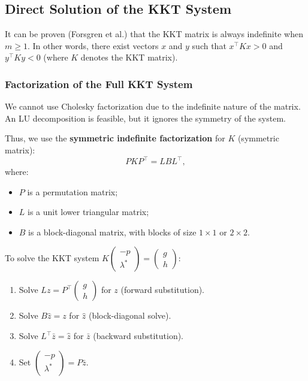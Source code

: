 \subsection{Direct Solution of the KKT System}

\begin{remarque}
    It can be proven (Forsgren et al.) that the KKT matrix is always indefinite when $m \ge 1$. In other words, there exist vectors $x$ and $y$ such that $x^\top K x > 0$ and $y^\top K y < 0$ (where $K$ denotes the KKT matrix).
\end{remarque}

\subsubsection{Factorization of the Full KKT System}

We cannot use Cholesky factorization due to the indefinite nature of the matrix.
An LU decomposition is feasible, but it ignores the symmetry of the system.

Thus, we use the \textbf{symmetric indefinite factorization} for $K$ (symmetric matrix):
\begin{equation}
    P K P^\top = L B L^\top,
\end{equation}
where:
\begin{itemize}
    \item $P$ is a permutation matrix;
    \item $L$ is a unit lower triangular matrix;
    \item $B$ is a block-diagonal matrix, with blocks of size $1 \times 1$ or $2 \times 2$.
\end{itemize}

To solve the KKT system $K \begin{pmatrix} -p \\ \lambda^* \end{pmatrix} = \begin{pmatrix} g \\ h \end{pmatrix}$:
\begin{enumerate}
    \item Solve $Lz = P^\top \begin{pmatrix} g \\ h \end{pmatrix}$ for $z$ (forward substitution).
    \item Solve $B\hat{z} = z$ for $\hat{z}$ (block-diagonal solve).
    \item Solve $L^\top \bar{z} = \hat{z}$ for $\bar{z}$ (backward substitution).
    \item Set $\begin{pmatrix} -p \\ \lambda^* \end{pmatrix} = P \bar{z}$.
\end{enumerate}

